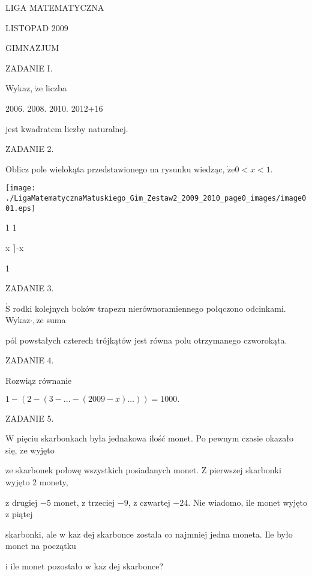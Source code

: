 \documentclass[a4paper,12pt]{article}
\begin{document}
LIGA MATEMATYCZNA

LISTOPAD 2009

GIMNAZJUM

ZADANIE I.

Wykaz, $\dot{\mathrm{z}}\mathrm{e}$ liczba

2006. 2008. 2010. 2012$+$16

jest kwadratem liczby naturalnej.

ZADANIE 2.

Oblicz pole wielokąta przedstawionego na rysunku wiedząc, $\dot{\mathrm{z}}\mathrm{e}0<x<1.$
\begin{center}
\texttt{[image: ./LigaMatematycznaMatuskiego\_Gim\_Zestaw2\_2009\_2010\_page0\_images/image001.eps]}
\end{center}
1  1

x  $\rceil$-x

1

ZADANIE 3.

$\acute{\mathrm{S}}$ rodki kolejnych boków trapezu nierównoramiennego połqczono odcinkami. Wykaz$\cdot, \dot{\mathrm{z}}\mathrm{e}$ suma

pól powstałych czterech trójkątów jest równa polu otrzymanego czworokąta.

ZADANIE 4.

Rozwiąz równanie

$1-(2-(3-\ldots-(2009-x)\ldots))=1000.$

ZADANIE 5.

$\mathrm{W}$ pięciu skarbonkach była jednakowa ilość monet. Po pewnym czasie okazało się, $\dot{\mathrm{z}}\mathrm{e}$ wyjęto

ze skarbonek połowę wszystkich posiadanych monet. Z pierwszej skarbonki wyjęto 2 monety,

z drugiej $-5$ monet, z trzeciej $-9$, z czwartej $-24$. Nie wiadomo, ile monet wyjęto z piątej

skarbonki, ale w $\mathrm{k}\mathrm{a}\dot{\mathrm{z}}$ dej skarbonce zostala co najmniej jedna moneta. Ile było monet na początku

i ile monet pozostało w $\mathrm{k}\mathrm{a}\dot{\mathrm{z}}$ dej skarbonce?
\end{document}
